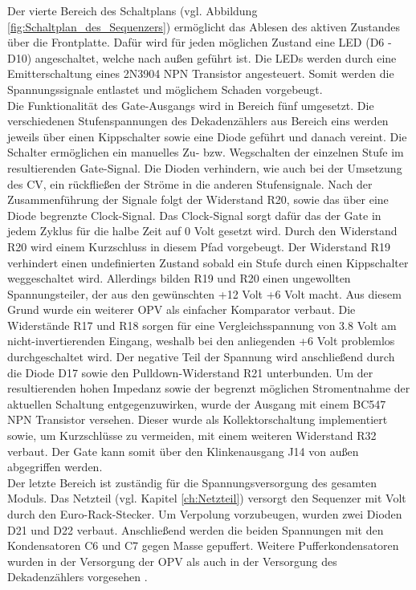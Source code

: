 Der vierte Bereich des Schaltplans (vgl. Abbildung \ref{fig:Schaltplan_des_Sequenzers}) ermöglicht das Ablesen des aktiven Zustandes über die Frontplatte. 
Dafür wird für jeden möglichen Zustand eine LED (D6 - D10) angeschaltet, welche nach außen geführt ist. 
Die LEDs werden durch eine Emitterschaltung eines 2N3904 NPN Transistor angesteuert. Somit werden die Spannungssignale entlastet und möglichem Schaden vorgebeugt.\\
Die Funktionalität des Gate-Ausgangs wird in Bereich fünf umgesetzt. Die verschiedenen Stufenspannungen des Dekadenzählers aus Bereich eins werden jeweils über einen Kippschalter sowie eine Diode geführt und danach vereint. Die Schalter ermöglichen ein manuelles Zu- bzw. Wegschalten der einzelnen Stufe im resultierenden Gate-Signal. Die Dioden verhindern, wie auch bei der Umsetzung des CV, ein rückfließen der Ströme in die anderen Stufensignale. Nach der Zusammenführung der Signale folgt der Widerstand R20, sowie das über eine Diode begrenzte Clock-Signal. Das Clock-Signal sorgt dafür das der Gate in jedem Zyklus für die halbe Zeit auf 0 Volt gesetzt wird. Durch den Widerstand R20 wird einem Kurzschluss in diesem Pfad vorgebeugt. Der Widerstand R19 verhindert einen undefinierten Zustand sobald ein Stufe durch einen Kippschalter weggeschaltet wird. Allerdings bilden R19 und R20 einen ungewollten Spannungsteiler, der aus den gewünschten +12 Volt +6 Volt macht. Aus diesem Grund wurde ein weiterer OPV als einfacher Komparator verbaut. Die Widerstände R17 und R18 sorgen für eine Vergleichsspannung von 3.8 Volt am nicht-invertierenden Eingang, weshalb bei den anliegenden +6 Volt problemlos durchgeschaltet wird. Der negative Teil der Spannung wird anschließend durch die Diode D17 sowie den Pulldown-Widerstand R21 unterbunden. Um der resultierenden hohen Impedanz sowie der begrenzt möglichen Stromentnahme der aktuellen Schaltung entgegenzuwirken, wurde der Ausgang mit einem BC547 NPN Transistor versehen. Dieser wurde als Kollektorschaltung implementiert sowie, um Kurzschlüsse zu vermeiden, mit einem weiteren Widerstand R32 verbaut. Der Gate kann somit über den Klinkenausgang J14 von außen abgegriffen werden.\\
Der letzte Bereich ist zuständig für die Spannungsversorgung des gesamten Moduls. Das Netzteil (vgl. Kapitel \ref{ch:Netzteil}) versorgt den Sequenzer mit  Volt durch den Euro-Rack-Stecker. Um Verpolung vorzubeugen, wurden zwei Dioden D21 und D22 verbaut. Anschließend werden die beiden Spannungen mit den Kondensatoren C6 und C7 gegen Masse gepuffert. Weitere Pufferkondensatoren wurden in der Versorgung der OPV als auch in der Versorgung des Dekadenzählers vorgesehen \cite{seq_manual}.

